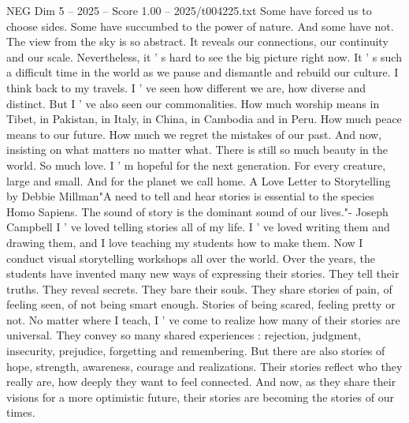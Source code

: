 \begin{textsample}{NEG Dim 5 – 2025 – Score 1.00 – 2025/t004225.txt}
Some have forced us to choose sides.
Some have succumbed to the power of nature.
And some have not.
The view from the sky is so abstract.
It reveals our connections, our continuity and our scale.
Nevertheless, it ' s hard to see the big picture right now.
It ' s such a difficult time in the world as we pause and dismantle and rebuild our culture.
I think back to my travels.
I ' ve seen how different we are, how diverse and distinct.
But I ' ve also seen our commonalities.
How much worship means in Tibet, in Pakistan, in Italy, in China, in Cambodia and in Peru.
How much peace means to our future.
How much we regret the mistakes of our past.
And now, insisting on what matters no matter what.
There is still so much beauty in the world.
So much love.
I ' m hopeful for the next generation.
For every creature, large and small.
And for the planet we call home.
A Love Letter to Storytelling by Debbie Millman"A need to tell and hear stories is essential to the species Homo Sapiens.
The sound of story is the dominant sound of our lives."- Joseph Campbell I ' ve loved telling stories all of my life.
I ' ve loved writing them and drawing them, and I love teaching my students how to make them.
Now I conduct visual storytelling workshops all over the world.
Over the years, the students have invented many new ways of expressing their stories.
They tell their truths.
They reveal secrets.
They bare their souls.
They share stories of pain, of feeling seen, of not being smart enough.
Stories of being scared, feeling pretty or not.
No matter where I teach, I ' ve come to realize how many of their stories are universal.
They convey so many shared experiences : rejection, judgment, insecurity, prejudice, forgetting and remembering.
But there are also stories of hope, strength, awareness, courage and realizations.
Their stories reflect who they really are, how deeply they want to feel connected.
And now, as they share their visions for a more optimistic future, their stories are becoming the stories of our times.

\end{textsample}
